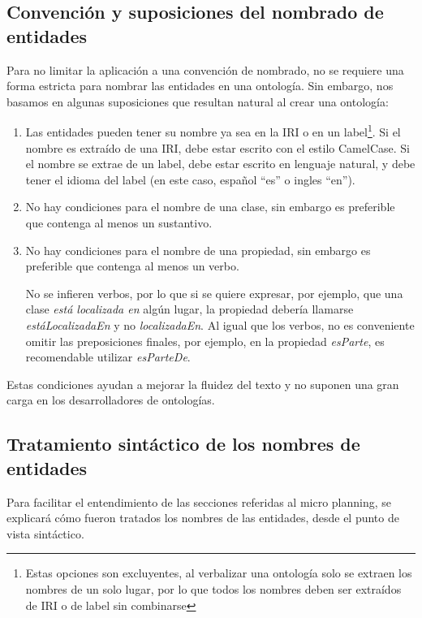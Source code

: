 \subsection{Convención y suposiciones del nombrado de entidades}
Para no limitar la aplicación a una convención de nombrado, no se requiere una forma estricta para nombrar las entidades en una ontología. Sin embargo, nos basamos en algunas suposiciones que resultan natural al crear una ontología:
\begin{enumerate}
    \item Las entidades pueden tener su nombre ya sea en la IRI o en un label\footnote{Estas opciones son excluyentes, al verbalizar una ontología solo se extraen los nombres de un solo lugar, por lo que todos los nombres deben ser extraídos de IRI o de label sin combinarse}. Si el nombre es extraído de una IRI, debe estar escrito con el estilo CamelCase. Si el nombre se extrae de un label, debe estar escrito en lenguaje natural, y debe tener el idioma del label (en este caso, español ``es'' o ingles ``en'').
    \item No hay condiciones para el nombre de una clase, sin embargo es preferible que contenga al menos un sustantivo.
    \item No hay condiciones para el nombre de una propiedad, sin embargo es preferible que contenga al menos un verbo. 
    
    No se infieren verbos, por lo que si se quiere expresar, por ejemplo, que una clase \emph{está localizada en} algún lugar, la propiedad debería llamarse \emph{estáLocalizadaEn} y no \emph{localizadaEn}. Al igual que los verbos, no es conveniente omitir las preposiciones finales, por ejemplo, en la propiedad \emph{esParte}, es recomendable utilizar \emph{esParteDe}.
\end{enumerate}

Estas condiciones ayudan a mejorar la fluidez del texto y no suponen una gran carga en los desarrolladores de ontologías.
\\

\subsection{Tratamiento sintáctico de los nombres de entidades}
Para facilitar el entendimiento de las secciones referidas al micro planning, se explicará cómo fueron tratados los nombres de las entidades, desde el punto de vista sintáctico. 

